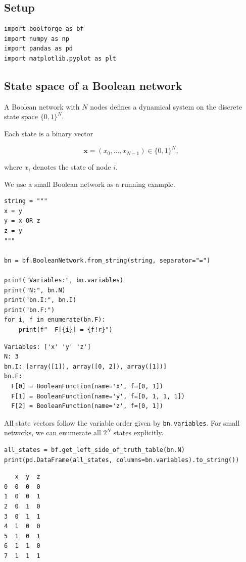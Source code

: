 \documentclass[
]{article}
\begin{document}
\subsection{Setup}\label{setup-6}

\begin{lstlisting}
import boolforge as bf
import numpy as np
import pandas as pd
import matplotlib.pyplot as plt
\end{lstlisting}

\subsection{State space of a Boolean
network}\label{state-space-of-a-boolean-network}

A Boolean network with \(N\) nodes defines a dynamical system on the
discrete state space \(\{0,1\}^N\).

Each state is a binary vector

\[
\mathbf{x} = (x_0, \ldots, x_{N-1}) \in \{0,1\}^N,
\]

where \(x_i\) denotes the state of node \(i\).

We use a small Boolean network as a running example.

\begin{lstlisting}
string = """
x = y
y = x OR z
z = y
"""

bn = bf.BooleanNetwork.from_string(string, separator="=")

print("Variables:", bn.variables)
print("N:", bn.N)
print("bn.I:", bn.I)
print("bn.F:")
for i, f in enumerate(bn.F):
    print(f"  F[{i}] = {f!r}")
\end{lstlisting}

\begin{lstlisting}
Variables: ['x' 'y' 'z']
N: 3
bn.I: [array([1]), array([0, 2]), array([1])]
bn.F:
  F[0] = BooleanFunction(name='x', f=[0, 1])
  F[1] = BooleanFunction(name='y', f=[0, 1, 1, 1])
  F[2] = BooleanFunction(name='z', f=[0, 1])
\end{lstlisting}

All state vectors follow the variable order given by
\texttt{bn.variables}. For small networks, we can enumerate all \(2^N\)
states explicitly.

\begin{lstlisting}
all_states = bf.get_left_side_of_truth_table(bn.N)
print(pd.DataFrame(all_states, columns=bn.variables).to_string())
\end{lstlisting}

\begin{lstlisting}
   x  y  z
0  0  0  0
1  0  0  1
2  0  1  0
3  0  1  1
4  1  0  0
5  1  0  1
6  1  1  0
7  1  1  1
\end{lstlisting}
\end{document}
